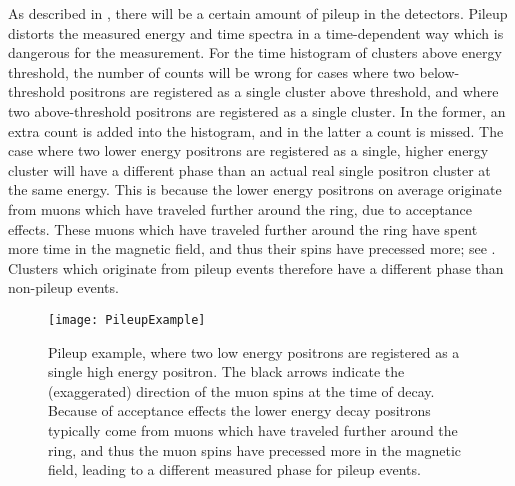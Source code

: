As described in , there will be a certain amount of pileup in the detectors. Pileup distorts the measured energy and time spectra in a time-dependent way which is dangerous for the \wa measurement. For the time histogram of clusters above energy threshold, the number of counts will be wrong for cases where two below-threshold positrons are registered as a single cluster above threshold, and where two above-threshold positrons are registered as a single cluster. In the former, an extra count is added into the histogram, and in the latter a count is missed. The case where two lower energy positrons are registered as a single, higher energy cluster will have a different \gmtwo phase than an actual real single positron cluster at the same energy. This is because the lower energy positrons on average originate from muons which have traveled further around the ring, due to acceptance effects. These muons which have traveled further around the ring have spent more time in the magnetic field, and thus their spins have precessed more; see . Clusters which originate from pileup events therefore have a different \gmtwo phase than non-pileup events. 

\begin{figure}
    \centering
    \texttt{[image: PileupExample]}
    \caption[Pileup example]{Pileup example, where two low energy positrons are registered as a single high energy positron. The black arrows indicate the (exaggerated) direction of the muon spins at the time of decay. Because of acceptance effects the lower energy decay positrons typically come from muons which have traveled further around the ring, and thus the muon spins have precessed more in the magnetic field, leading to a different measured \gmtwo phase for pileup events.}
    \label{fig:PileupExample}
\end{figure}

